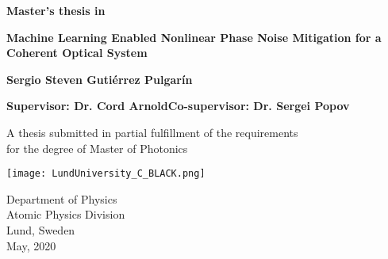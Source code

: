
\setcounter{page}{1}

\newpage



\thispagestyle{empty}
\begin{center}
   \vspace*{1cm}
  {\large \textbf{Master's thesis in  }}

  \vspace*{0.5cm}
  {\LARGE \bf\noindent \textbf{Machine Learning Enabled Nonlinear Phase Noise Mitigation for a Coherent Optical System  }}

  \vspace*{1cm}
  {\large\bf Sergio Steven Guti\'errez Pulgar\'in}
  
  \vspace*{0.30cm}
	{\normalsize \bf Supervisor: Dr. Cord Arnold\hfill   Co-supervisor: Dr. Sergei Popov}
	
  \vfill

  {\large A thesis submitted in partial fulfillment of the requirements\\
  [1mm] for the degree of Master of Photonics}
  \vspace*{0.9cm}
  
   \texttt{[image: LundUniversity\_C\_BLACK.png]}

  {\large Department of Physics \\
          [-1mm] Atomic Physics Division\\
          [-1mm] Lund, Sweden\\
          [1mm]  May, 2020}
%          
%	
%	


\end{center}

